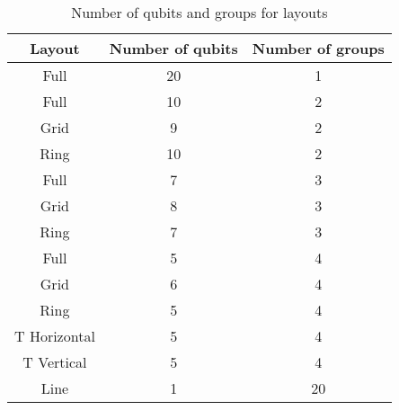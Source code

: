 \begin{table}[htb]
\centering
\caption{Number of qubits and groups for layouts}
\label{tab:layout-qubit-group}
\begin{tabular}{|c|c|c|} 
\hline
\textbf{Layout} & \textbf{Number of qubits} & \textbf{Number of groups}  \\ 
\hline
Full            & 20                        & 1                         \\ 
\hline
Full            & 10                        & 2                         \\ 
\hline
Grid            & 9                         & 2                         \\ 
\hline
Ring            & 10                        & 2                         \\ 
\hline
Full            & 7                         & 3                         \\ 
\hline
Grid            & 8                         & 3                         \\ 
\hline
Ring            & 7                         & 3                         \\ 
\hline
Full            & 5                         & 4                         \\ 
\hline
Grid            & 6                         & 4                         \\ 
\hline
Ring            & 5                         & 4                         \\ 
\hline
T Horizontal    & 5                         & 4                         \\ 
\hline
T Vertical      & 5                         & 4                         \\ 
\hline
Line            & 1                         & 20                        \\
\hline
\end{tabular}
\end{table}